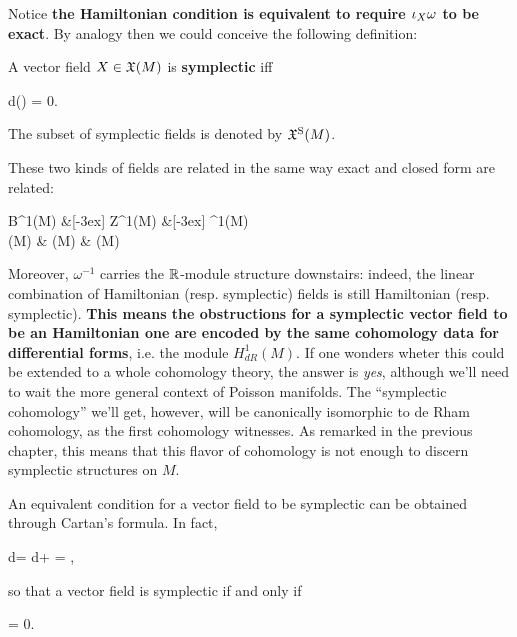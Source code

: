 \documentclass[main.tex]{subfiles}
\begin{document}
Notice \textbf{the Hamiltonian condition is equivalent to require $\iota_{X}\omega$ to be exact}. By analogy then we could conceive the following definition:

\begin{definition}
	A vector field $X \in \mathfrak{X}(M)$ is \textbf{symplectic} iff
	\begin{eqalign}
		d(\omega) = 0.
	\end{eqalign}
	The subset of symplectic fields is denoted by $\mathfrak{X}^{\mathrm{S}}(M)$.
\end{definition}

\begin{remark}
\label{rmk:symp_cohomology_is_dr_cohomology}
	These two kinds of fields are related in the same way exact and closed form are related:
	\begin{diagram}
	\label{diag:ham_symp_fields_inclusions}
		B^1(M)   \&[-3ex] Z^1(M)   \&[-3ex] \Omega^1(M) \arrow{d}{\omega^{-1}}\\
		\hamfields(M)  \& \sympfields(M)  \& \fields(M)
	\end{diagram}
	Moreover, $\omega^{-1}$ carries the $\mathbb{R}$-module structure downstairs: indeed, the linear combination of Hamiltonian (resp. symplectic) fields is still Hamiltonian (resp. symplectic). \textbf{This means the obstructions for a symplectic vector field to be an Hamiltonian one are encoded by the same cohomology data for differential forms}, i.e. the module $H^1_{dR}(M)$. If one wonders wheter this could be extended to a whole cohomology theory, the answer is \emph{yes}, although we'll need to wait the more general context of Poisson manifolds. The ``symplectic cohomology'' we'll get, however, will be canonically isomorphic to de Rham cohomology, as the first cohomology witnesses. As remarked in the previous chapter, this means that this flavor of cohomology is not enough to discern symplectic structures on $M$.
\end{remark}

\begin{remark}
\label{rmk:omega_is_const_on_symp_fields}
	An equivalent condition for a vector field to be symplectic can be obtained through Cartan's formula. In fact,
	\begin{eqalign}
		d\omega = d\omega +  = \omega,
	\end{eqalign}
	so that a vector field is symplectic if and only if
	\begin{eqalign}
		 \omega = 0.
	\end{eqalign}
\end{remark}
\end{document}
